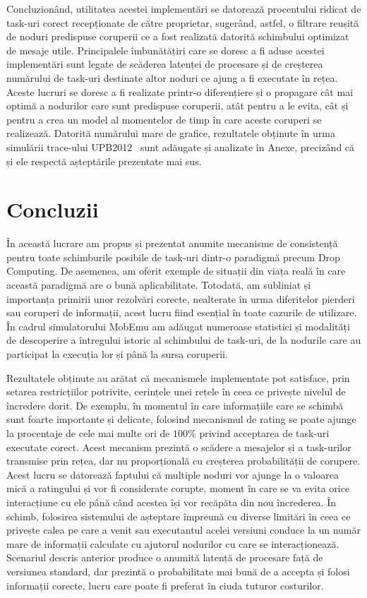 \documentclass[12pt,a4paper]{report}
\begin{document}
Concluzionând, utilitatea acestei implementări se datorează procentului ridicat de task-uri corect recepționate de către proprietar, sugerând, astfel, o filtrare reușită de noduri predispuse coruperii ce a fost realizată datorită schimbului optimizat de mesaje utile. Principalele îmbunătățiri care se doresc a fi aduse acestei implementări sunt legate de scăderea latenței de procesare și de creșterea numărului de task-uri destinate altor noduri ce ajung a fi executate în rețea. Aceste lucruri se doresc a fi realizate printr-o diferențiere și o propagare cât mai optimă a nodurilor care sunt predispuse coruperii, atât pentru a le evita, cât și pentru a crea un model al momentelor de timp în care aceste coruperi se realizează. Datorită numărului mare de grafice, rezultatele obținute în urma simulării trace-ului UPB2012~\cite{upb2012} sunt adăugate și analizate în Anexe, precizând că și ele respectă așteptările prezentate mai sus. 

\chapter{Concluzii} \label{concluzii}
În această lucrare am propus și prezentat anumite mecanisme de consistență pentru toate schimburile posibile de task-uri dintr-o paradigmă precum Drop Computing. De asemenea, am oferit exemple de situații din viața reală în care această paradigmă are o bună aplicabilitate. Totodată, am subliniat și importanța primirii unor rezolvări corecte, nealterate în urma diferitelor pierderi sau coruperi de informații, acest lucru fiind esențial în toate cazurile de utilizare. În cadrul simulatorului MobEmu am adăugat numeroase statistici și modalități de descoperire a întregului istoric al schimbului de task-uri, de la nodurile care au participat la execuția lor și până la sursa coruperii.

Rezultatele obținute au arătat că mecanismele implementate pot satisface, prin setarea restricțiilor potrivite, cerințele unei rețele în ceea ce privește nivelul de încredere dorit. De exemplu, în momentul în care informațiile care se schimbă sunt foarte importante și delicate, folosind mecanismul de rating se poate ajunge la procentaje de cele mai multe ori de $100\%$ privind acceptarea de task-uri executate corect. Acest mecanism prezintă o scădere a mesajelor și a task-urilor transmise prin rețea, dar nu proporțională cu creșterea probabilității de corupere. Acest lucru se datorează faptului că multiple noduri vor ajunge la o valoarea mică a ratingului și vor fi considerate corupte, moment în care se va evita orice interacțiune cu ele până când acestea își vor recăpăta din nou încrederea. În schimb, folosirea sistemului de așteptare împreună cu diverse limitări în ceea ce privește calea pe care a venit sau executantul acelei versiuni conduce la un număr mare de informații calculate cu ajutorul nodurilor cu care se interacționează. Scenariul descris anterior produce o anumită latență de procesare față de versiunea standard, dar prezintă o probabilitate mai bună de a accepta și folosi informații corecte, lucru care poate fi preferat în ciuda tuturor costurilor.
\end{document}

